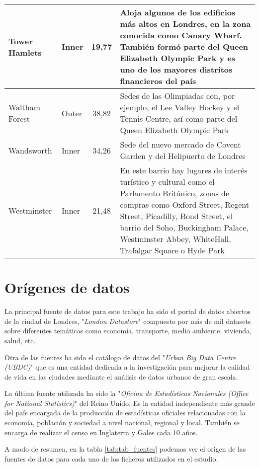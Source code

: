 \documentclass[12pt,a4paper,twoside]{book}
\begin{document}
\begin{longtable}{>{\raggedright\arraybackslash}p{7em}lc>{\raggedright\arraybackslash}m{22em}}
\hline
Tower Hamlets & Inner & 19,77 & Aloja algunos de los edificios más altos en Londres, en la zona conocida como Canary Wharf. También formó parte del Queen Elizabeth Olympic Park y es uno de los mayores distritos financieros del país \\
\hline
Waltham Forest & Outer & 38,82 & Sedes de las Olimpiadas con, por ejemplo, el Lee Valley Hockey y el Tennis Centre, así como parte del Queen Elizabeth Olympic Park \\
\hline
Wandsworth & Inner & 34,26 & Sede del nuevo mercado de Covent Garden y del Helipuerto de Londres \\
\hline
Westminster & Inner & 21,48 & En este barrio hay lugares de interés turístico y cultural como el Parlamento Británico, zonas de compras como Oxford Street, Regent Street, Picadilly, Bond Street, el barrio del Soho, Buckingham Palace, Westminster Abbey, WhiteHall, Trafalgar Square o Hyde Park \\
\hline
\end{longtable}

\section{Orígenes de datos}

La principal fuente de datos para este trabajo ha sido el portal de datos abiertos de la ciudad de Londres, "\textit{London Datastore}" \cite{noauthor_london_nodate-1} compuesto por más de mil datasets sobre diferentes temáticas como economía, transporte, medio ambiente, vivienda, salud, etc.

Otra de las fuentes ha sido el catálogo de datos del "\textit{Urban Big Data Centre (UBDC)}" \cite{noauthor_ubdc_nodate} que es una entidad dedicada a la investigación para mejorar la calidad de vida en las ciudades mediante el análisis de datos urbanos de gran escala.

La última fuente utilizada ha sido la "\textit{Oficina de Estadísticas Nacionales (Office for National Statistics)}" \cite{noauthor_home_nodate} del Reino Unido. Es la entidad independiente más grande del país encargada de la producción de estadísticas oficiales relacionadas con la economía, población y sociedad a nivel nacional, regional y local. También se encarga de realizar el censo en Inglaterra y Gales cada 10 años.

A modo de resumen, en la tabla \ref{tab:tab_fuentes} podemos ver el origen de las fuentes de datos para cada uno de los ficheros utilizados en el estudio.
\end{document}
